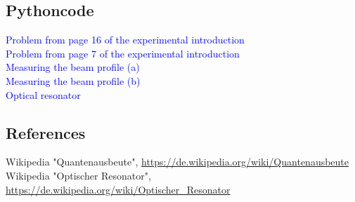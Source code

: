\documentclass{article}
\begin{document}



\subsection{Pythoncode}


\textcolor{blue}{Problem from page 16 of the experimental introduction}\\



\textcolor{blue}{Problem from page 7 of the experimental introduction}\\



\textcolor{blue}{Measuring the beam profile (a)}\\

\textcolor{blue}{Measuring the beam profile (b)}\\


\textcolor{blue}{Optical resonator}\\


\subsection{References}

\begin{thebibliography}{9}
 Wikipedia "Quantenausbeute", \url{https://de.wikipedia.org/wiki/Quantenausbeute} 
 Wikipedia "Optischer Resonator", \url{https://de.wikipedia.org/wiki/Optischer_Resonator}
\end{thebibliography}
\end{document}
